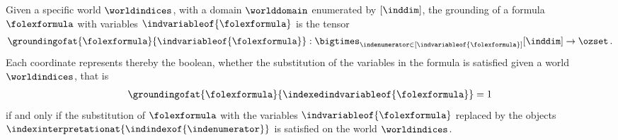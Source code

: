 \begin{definition}
    Given a specific world $\worldindices$, with a domain $\worlddomain$ enumerated by $[\inddim]$, the grounding of a formula $\folexformula$ with variables $\indvariableof{\folexformula}$  is the tensor
    \begin{align*}
        \groundingofat{\folexformula}{\indvariableof{\folexformula}} :
        \bigtimes_{\indenumerator\in[\indvariableof{\folexformula}]} [\inddim] \rightarrow \ozset \, .
    \end{align*}
    Each coordinate represents thereby the boolean, whether the substitution of the variables in the formula is satisfied given a world $\worldindices$, that is
    \begin{align*}
        \groundingofat{\folexformula}{\indexedindvariableof{\folexformula}} = 1
    \end{align*}
    if and only if the substitution of $\folexformula$ with the variables $\indvariableof{\folexformula}$ replaced by the objects $\indexinterpretationat{\indindexof{\indenumerator}}$ is satisfied on the world $\worldindices$.
\end{definition}




%

